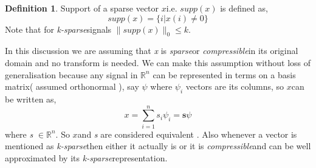 \documentclass[12pt]{article}
\theoremstyle{definition}
\newtheorem{defn}{Definition}[section]
\def\compressible{\textit{compressible}\hspace{0.1in}}
\def\sparse{\textit{sparse}\hspace{0.1in}}
\def\ksparse{\textit{k-sparse}\hspace{0.1in}}
\def\x{$x$\hspace{0.1in}}
\begin{document}
\begin{defn}
 Support of a sparse vector \x i.e. $supp(x)$ is defined as,
 \begin{equation}
  supp(x) = \{i | x(i) \neq 0 \}
 \end{equation}
 Note that for \ksparse signals $\| supp(x) \|_0 \leq k$.
\end{defn}

In this discussion we are assuming that \textit{x} is \sparse or \compressible in its original domain and no transform
is needed. We can make this assumption without loss of generalisation because any signal in $\mathbb{R}^n$ can be 
represented in terms on a basis matrix( assumed orthonormal ), say $\psi$ where $\psi_i$ vectors are its columns, so \x can be written as,
\begin{equation}
 x = \sum_{i=1}^{n} s_i \psi_i = \textbf{s} \psi 
\end{equation}
where \textit{s} $\in \mathbb{R}^n$. So \x and \textit{s} are considered equivalent \cite{Baraniuk-CS}. Also whenever
a vector is mentioned as \ksparse then either it actually is or it is \compressible and can be well approximated 
by its \ksparse representation.
\end{document}
